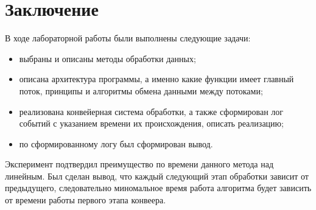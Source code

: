 \chapter*{Заключение}
В ходе лабораторной работы были выполнены следующие задачи:
\begin{itemize}
	\item выбраны и описаны методы обработки данных;
	\item описана архитектура программы, а именно какие функции имеет главный поток, принципы и алгоритмы обмена данными между потоками;
	\item реализована конвейерная система обработки, а также сформирован лог событий с указанием времени их происхождения, описать реализацию;
	\item по сформированному логу был сформирован вывод.
\end{itemize}
Эксперимент подтвердил преимущество по времени данного метода над линейным.
Был сделан вывод, что каждый следующий этап обработки зависит от предыдущего, следовательно миномальное время работа алгоритма будет зависить от времени работы первого этапа конвеера.